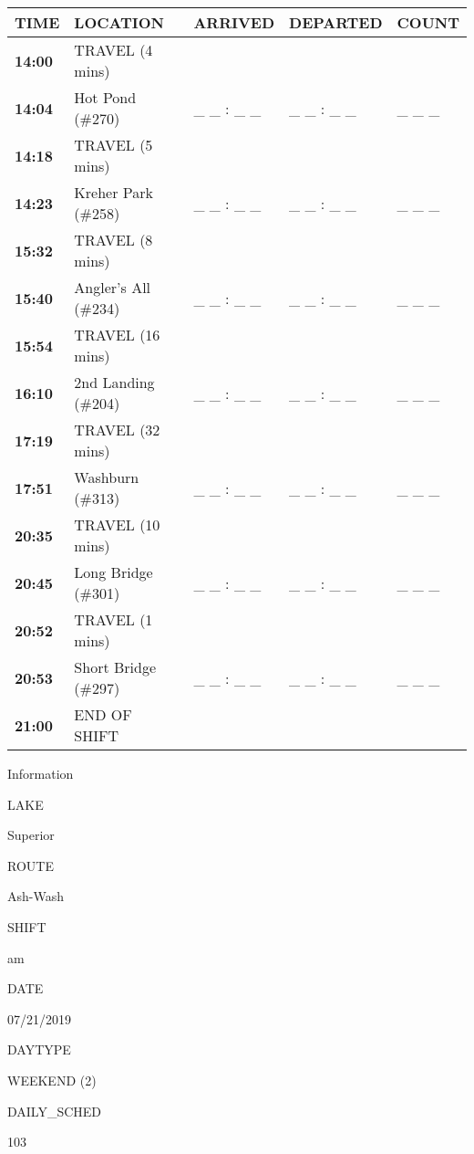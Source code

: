 \documentclass[]{article}
\begin{document}
\begin{tabular}{>{\bfseries}lllll}
\toprule
\textbf{TIME} & \textbf{LOCATION} & \textbf{ARRIVED} & \textbf{DEPARTED} & \textbf{COUNT}\\
\midrule
14:00 & TRAVEL (4 mins) &  &  & \\
14:04 & Hot Pond (\#270) & \_ \_ : \_ \_ & \_ \_ : \_ \_ & \_ \_ \_\\
14:18 & TRAVEL (5 mins) &  &  & \\
14:23 & Kreher Park (\#258) & \_ \_ : \_ \_ & \_ \_ : \_ \_ & \_ \_ \_\\
15:32 & TRAVEL (8 mins) &  &  & \\
15:40 & Angler's All (\#234) & \_ \_ : \_ \_ & \_ \_ : \_ \_ & \_ \_ \_\\
15:54 & TRAVEL (16 mins) &  &  & \\
16:10 & 2nd Landing (\#204) & \_ \_ : \_ \_ & \_ \_ : \_ \_ & \_ \_ \_\\
17:19 & TRAVEL (32 mins) &  &  & \\
17:51 & Washburn (\#313) & \_ \_ : \_ \_ & \_ \_ : \_ \_ & \_ \_ \_\\
20:35 & TRAVEL (10 mins) &  &  & \\
20:45 & Long Bridge (\#301) & \_ \_ : \_ \_ & \_ \_ : \_ \_ & \_ \_ \_\\
20:52 & TRAVEL (1 mins) &  &  & \\
20:53 & Short Bridge (\#297) & \_ \_ : \_ \_ & \_ \_ : \_ \_ & \_ \_ \_\\
21:00 & END OF SHIFT &  &  & \\
\bottomrule
\end{tabular}\newpage

Information

LAKE

Superior

ROUTE

Ash-Wash

SHIFT

am

DATE

07/21/2019

DAYTYPE

WEEKEND (2)

DAILY\_SCHED

103

\vspace{24pt}
\end{document}
